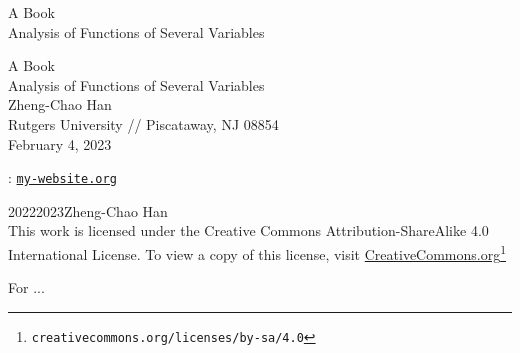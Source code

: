 \documentclass[oneside,10pt,]{book}
\newcommand{\titlepagefont}{\relax}
\newcommand{\mono}[1]{\texttt{#1}}
\begin{document}
\raggedbottom
\frontmatter
\thispagestyle{empty}
{\titlepagefont\centering
\vspace*{0.28\textheight}
{\Huge A Book}\\[2\baselineskip]
{\LARGE Analysis of Functions of Several Variables}\\
}
\clearpage
\thispagestyle{empty}
{\titlepagefont\centering
\vspace*{0.14\textheight}
{\Huge A Book}\\[\baselineskip]
{\LARGE Analysis of Functions of Several Variables}\\[3\baselineskip]
{\Large Zheng-Chao Han}\\[0.5\baselineskip]
{\Large Rutgers University \slash{}\slash{} Piscataway, NJ 08854}\\[3\baselineskip]
{\Large February 4, 2023}\\}
\clearpage
\thispagestyle{empty}
\hypertarget{colophon-meta_frontmatter-b}{}
: \href{http:\slash{}\slash{}pretextbook.org}{\mono{my-website.org}}\par\medskip
\noindent\textcopyright{}2022\textendash{}2023\quad{}Zheng-Chao Han\\[0.5\baselineskip]
 This work is licensed under the Creative Commons Attribution-ShareAlike 4.0 International License. To view a copy of this license, visit \href{http://creativecommons.org/licenses/by-sa/4.0/}{CreativeCommons.org}\footnote{\nolinkurl{creativecommons.org/licenses/by-sa/4.0}\label{fn-meta_frontmatter-b-b-c-b}}\par\medskip
{}
\null\clearpage
\cleardoublepage
\thispagestyle{empty}
\begin{center}\Large%
For ...%
\end{center}
\clearpage
%
%
\typeout{************************************************}
\typeout{************************************************}
\end{document}
